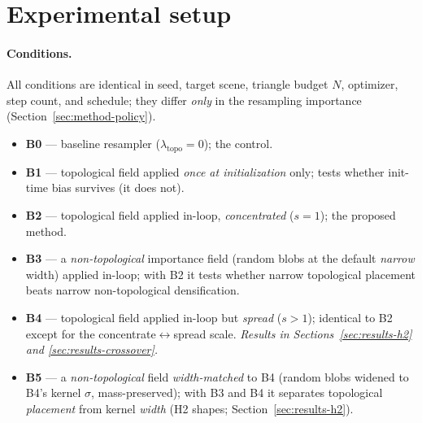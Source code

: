 \section{Experimental setup}
\label{sec:setup}

\paragraph{Conditions.}
All conditions are identical in seed, target scene, triangle budget $N$,
optimizer, step count, and schedule; they differ \emph{only} in the resampling
importance (Section~\ref{sec:method-policy}).
\begin{itemize}
  \item \textbf{B0} --- baseline resampler ($\lambda_{\text{topo}}=0$); the control.
  \item \textbf{B1} --- topological field applied \emph{once at initialization} only;
        tests whether init-time bias survives (it does not).
  \item \textbf{B2} --- topological field applied in-loop, \emph{concentrated}
        ($s\!=\!1$); the proposed method.
  \item \textbf{B3} --- a \emph{non-topological} importance field (random blobs at the
        default \emph{narrow} width) applied in-loop; with B2 it tests whether narrow
        topological placement beats narrow non-topological densification.
  \item \textbf{B4} --- topological field applied in-loop but \emph{spread}
        ($s\!>\!1$); identical to B2 except for the concentrate$\leftrightarrow$spread
        scale. \emph{Results in Sections~\ref{sec:results-h2} and \ref{sec:results-crossover}.}
  \item \textbf{B5} --- a \emph{non-topological} field \emph{width-matched} to B4
        (random blobs widened to B4's kernel $\sigma$, mass-preserved); with B3 and B4
        it separates topological \emph{placement} from kernel \emph{width}
        (H2 shapes; Section~\ref{sec:results-h2}).
\end{itemize}


